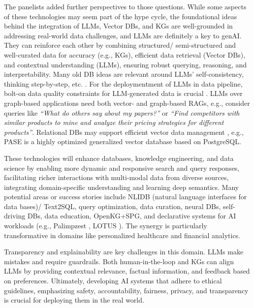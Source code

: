 \documentclass{sig-alternate-10pt}
\begin{document}
The panelists added further perspectives to those questions.  While some aspects of these technologies may seem part of the hype cycle, the foundational ideas behind the integration of LLMs, Vector DBs, and KGs are well-grounded in addressing real-world data challenges, and LLMs are definitely a key to genAI. They can reinforce each other by combining structured/ semi-structured and well-curated data for accuracy (e.g., KGs), efficient data retrieval (Vector DBs), and contextual understanding (LLMs), ensuring robust querying, reasoning, and interpretability. Many old DB ideas are relevant around LLMs' self-consistency, thinking step-by-step, etc. \cite{ParameswaranSAJ24}.
For the deploymentment of LLMs in data pipeline, bolt-on data quality constraints for LLM-generated data is crucial \cite{SLAHLZCFPW24}.
LLMs over graph-based applications need both vector- and graph-based RAGs, e.g., consider queries like {\em``What do others say about my papers?''}  or {\em``Find competitors with similar products to mine and analyze their pricing strategies for different products''}. Relational DBs may support efficient vector data management \cite{ZhangLW24}, e.g., PASE is a highly optimized generalized vector
database based on PostgreSQL.

These technologies will enhance databases, knowledge engineering, and data science by enabling more dynamic and responsive search and query responses, facilitating richer interactions with multi-modal data from diverse sources, integrating domain-specific understanding and learning deep semantics. Many potential areas or success stories include NLIDB (natural language interfaces for data bases)/ Text2SQL, query optimization, data curation, neural DBs, self-driving DBs, data education, OpenKG+SPG, and declarative systems for AI workloads (e.g., Palimpzest \cite{LRCCCCFKMV24}, LOTUS \cite{PJGZ24}). The synergy is particularly transformative in domains like personalized healthcare and financial analytics. 

Transparency and explainability are key challenges in this domain. LLMs make mistakes and require guardrails.
Both human-in-the-loop and KGs can align LLMs by providing contextual relevance, factual information, and feedback based on preferences. Ultimately, developing AI systems that adhere to ethical guidelines, emphasizing safety, accountability, fairness, privacy, and transparency is crucial for deploying them in the real world. 
\end{document}
